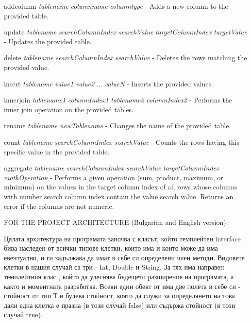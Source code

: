 \begin{DoxyItemize}
\item addcolumn {\itshape tablename} {\itshape columnname} {\itshape columntype} -\/ Adds a new column to the provided table.
\item update {\itshape tablename} {\itshape search\+Column\+Index} {\itshape search\+Value} {\itshape target\+Column\+Index} {\itshape target\+Value} -\/ Updates the provided table.
\item delete {\itshape tablename} {\itshape search\+Column\+Index} {\itshape search\+Value} -\/ Deletes the rows matching the provided value.
\item insert {\itshape tablename} {\itshape value1} {\itshape value2} ... {\itshape valueN} -\/ Inserts the provided values.
\item innerjoin {\itshape tablename1} {\itshape column\+Index1} {\itshape tablename2} {\itshape column\+Index2} -\/ Performs the inner join operation on the provided tables.
\item rename {\itshape tablename} {\itshape new\+Tablename} -\/ Changes the name of the provided table.
\item count {\itshape tablename} {\itshape search\+Column\+Index} {\itshape search\+Value} -\/ Counts the rows having this specific value in the provided table.
\item aggregate {\itshape tablename} {\itshape search\+Column\+Index} {\itshape search\+Value} {\itshape target\+Column\+Index} {\itshape math\+Operation} -\/ Performs a given operation (sum, product, maximum, or minimum) on the values in the target column index of all rows whose columns with number search column index contain the value search value. Returns an error if the columns are not numeric.
\end{DoxyItemize}

FOR THE PROJECT ARCHITECTURE (Bulgarian and English version)\+:

Цялата архитектура на програмата започва с  класът, който темплейтен interface бива наследен от всички типове клетки, които има и които може да има евентуално, и ги задължава да имат в себе си определени член методи. Видовете клетки в нашия случай са три -\/ Int, Double и String. За тях има направен темплейтния клас , който да улеснява бъдещето разширение на програмата, а както и моментната разработка. Всеки един обект от  има две полета в себе си -\/ стойност от тип Т и булева стойност, която да служи за определянето на това дали една клетка е празна (в този случай false) или съдържа стойност (в този случай true).

